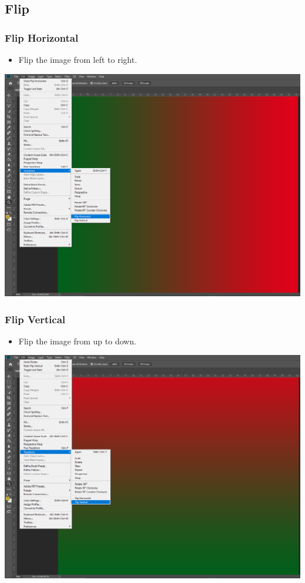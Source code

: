 \documentclass{beamer}
\begin{document}
		\subsection{Flip}
\begin{frame}
	\frametitle{Flip Horizontal}
	\begin{itemize}
		\item Flip the image from left to right.
	\end{itemize}
	\begin{center}
		\includegraphics[width = 1.0\textwidth]{images/flip horizontal.png}
	\end{center}
\end{frame}

\begin{frame}
	\frametitle{Flip Vertical}
\begin{itemize}
	\item Flip the image from up to down.
\end{itemize}
\begin{center}
	\includegraphics[width = 1.0\textwidth]{images/Flip Vertical.png}
\end{center}
\end{frame}
\end{document}
